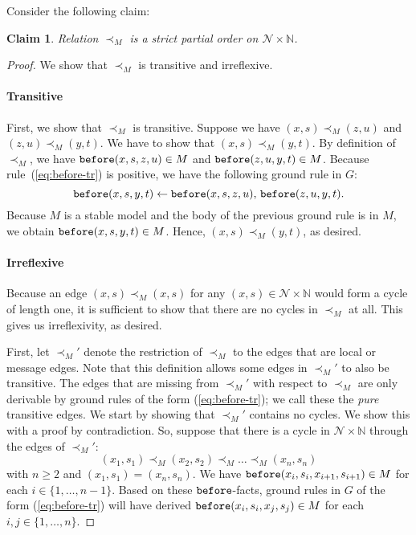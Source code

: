 \documentclass{tlp}
\newtheorem{claim}[theorem]{Claim}
\newcommand{\Nat}{\mathbb{N}}  \newcommand{\len}[1]{|#1|} \newcommand{\rom}[1]{\text{\emph{(#1)}}} \newcommand{\romI}{\rom i}
\newcommand{\nw}{\mathcal{N}}
\newcommand{\before}{\pred{before}}
\newcommand{\nwnat}{\nw\times\Nat}
\newcommand{\grded}{G}
\newcommand{\cauM}{\prec_{M}}
\begin{document}
Consider the following claim:



\begin{claim}\label{claim:M-partial-order}Relation $\cauM$ is a
strict partial order on $\nwnat$.\end{claim}

\begin{proof}
We show that $\cauM$ is transitive and irreflexive.


\paragraph*{Transitive}

First, we show that $\cauM$ is transitive. Suppose we have $(x,s)\cauM(z,u)$
and $(z,u)\cauM(y,t)$. We have to show that $(x,s)\cauM(y,t)$. By
definition of $\cauM$, we have $\before(x,s,z,u)\in M$ and $\before(z,u,y,t)\in M$.
Because rule~(\ref{eq:before-tr}) is positive, we have the following
ground rule in $\grded$:
\[
\before(x,s,y,t)\gets\before(x,s,z,u),\,\before(z,u,y,t).
\]
Because $M$ is a stable model and the body of the previous ground
rule is in $M$, we obtain $\before(x,s,y,t)\in M$. Hence, $(x,s)\cauM(y,t)$,
as desired.




\paragraph*{Irreflexive}

Because an edge $(x,s)\cauM(x,s)$ for any $(x,s)\in\nwnat$ would
form a cycle of length one, it is sufficient to show that there are
no cycles in $\cauM$ at all. This gives us irreflexivity, as desired.

First, let $\cauM'$ denote the restriction of $\cauM$ to the edges
that are local or message edges. Note that this definition allows
some edges in $\cauM'$ to also be transitive. The edges that are
missing from $\cauM'$ with respect to $\cauM$ are only derivable
by ground rules of the form (\ref{eq:before-tr}); we call these the
\emph{pure} transitive edges. We start by showing that $\cauM'$
contains no cycles. We show this with a proof by contradiction. So,
suppose that there is a cycle in $\nwnat$ through the edges of $\cauM'$:
\[
(x_{1},s_{1})\cauM(x_{2},s_{2})\cauM\ldots\cauM(x_{n},s_{n})
\]
with $n\geq2$ and $(x_{1},s_{1})=(x_{n},s_{n})$. We have $\before(x_{i},s_{i},x_{i+1},s_{i+1})\in M$
for each $i\in\{1,\ldots,n-1\}$. Based on these $\before$-facts,
ground rules in $\grded$ of the form (\ref{eq:before-tr}) will have
derived $\before(x_{i},s_{i},x_{j},s_{j})\in M$ for each $i,j\in\{1,\ldots,n\}$. 


\end{proof}
\end{document}
